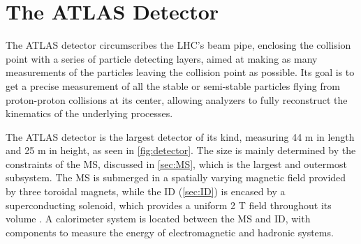 
\chapter{The ATLAS Detector} %

\label{ch:atlas} %

The \acf{ATLAS} detector circumscribes the \ac{LHC}'s beam pipe, enclosing the collision point with a series of particle detecting layers, aimed at making as many measurements of the particles leaving the collision point as possible. Its goal is to get a precise measurement of all the stable or semi-stable particles flying from proton-proton collisions at its center, allowing analyzers to fully reconstruct the kinematics of the underlying processes.

The \ac{ATLAS} detector is the largest detector of its kind, measuring 44 m in length and 25 m in height, as seen in \autoref{fig:detector}. The size is mainly determined by the constraints of the \acf{MS}, discussed in \autoref{sec:MS}, which is the largest and outermost subsystem. The \ac{MS} is submerged in a spatially varying magnetic field provided by three toroidal magnets, while the \acf{ID} (\autoref{sec:ID}) is encased by a superconducting solenoid, which provides a uniform 2 T field throughout its volume \cite{PERF-2007-01}. A calorimeter system is located between the \ac{MS} and \ac{ID}, with components to measure the energy of electromagnetic and hadronic systems. 


